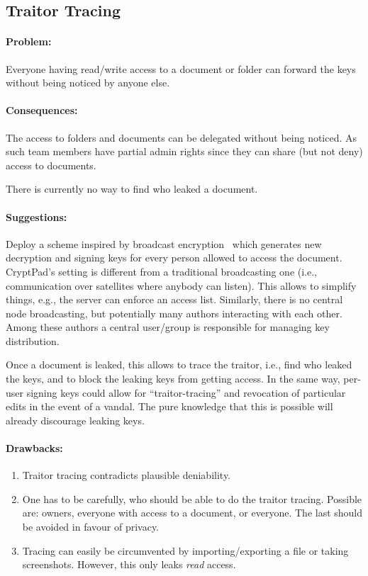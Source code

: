 \subsection{Traitor Tracing}

\paragraph{Problem:}
Everyone having read/write access to a document or folder can forward the keys without being noticed by anyone else.

\paragraph{Consequences:}
The access to folders and documents can be delegated without being noticed.
As such team members have partial admin rights since they can share (but not deny) access to documents.

There is currently no way to find who leaked a document.

\paragraph{Suggestions:}
Deploy a scheme inspired by broadcast encryption~\cite{Fiat1993} which generates new decryption and signing keys for every person allowed to access the document.
CryptPad's setting is different from a traditional broadcasting one (i.e., communication over satellites where anybody can listen).
This allows to simplify things, e.g., the server can enforce an access list.
Similarly, there is no central node broadcasting, but potentially many authors interacting with each other.
Among these authors a central user/group is responsible for managing key distribution.

Once a document is leaked, this allows to trace the traitor, i.e., find who leaked the keys, and to block the leaking keys from getting access.
In the same way, per-user signing keys could allow for \enquote{traitor-tracing} and revocation of particular edits in the event of a vandal.
The pure knowledge that this is possible will already discourage leaking keys.

\paragraph{Drawbacks:}
\begin{enumerate}
  \item Traitor tracing contradicts plausible deniability.
  \item One has to be carefully, who should be able to do the traitor tracing. Possible are: owners, everyone with access to a document, or everyone. The last should be avoided in favour of privacy.
  \item Tracing can easily be circumvented by importing/exporting a file or taking screenshots. However, this only leaks \textit{read} access.
\end{enumerate}

